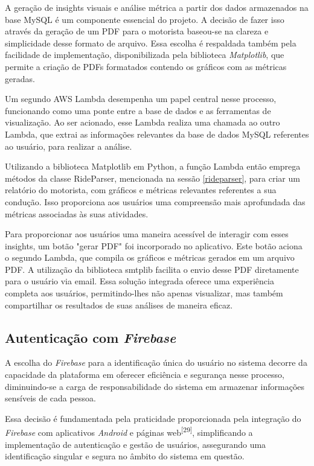     A geração de insights visuais e análise métrica a partir dos dados armazenados na base MySQL é um componente essencial do projeto. A decisão de fazer isso através da geração de um PDF para o motorista baseou-se na clareza e simplicidade desse formato de arquivo. Essa escolha é respaldada também pela facilidade de implementação, disponibilizada pela biblioteca \textit{Matplotlib}, que permite a criação de PDFs formatados contendo os gráficos com as métricas geradas.
    
    Um segundo AWS Lambda desempenha um papel central nesse processo, funcionando como uma ponte entre a base de dados e as ferramentas de visualização. Ao ser acionado, esse Lambda realiza uma chamada ao outro Lambda, que extrai as informações relevantes da base de dados MySQL referentes ao usuário, para realizar a análise.

    Utilizando a biblioteca Matplotlib em Python, a função Lambda então emprega métodos da classe RideParser, mencionada na sessão \ref{rideparser}, para criar um relatório do motorista, com gráficos e métricas relevantes referentes a sua condução. Isso proporciona aos usuários uma compreensão mais aprofundada das métricas associadas às suas atividades.
    
    Para proporcionar aos usuários uma maneira acessível de interagir com esses insights, um botão "gerar PDF" foi incorporado no aplicativo. Este botão aciona o segundo Lambda, que compila os gráficos e métricas gerados em um arquivo PDF. A utilização da biblioteca smtplib facilita o envio desse PDF diretamente para o usuário via email. Essa solução integrada oferece uma experiência completa aos usuários, permitindo-lhes não apenas visualizar, mas também compartilhar os resultados de suas análises de maneira eficaz.    

    \subsection{Autenticação com \textit{Firebase}}

    A  escolha do \textit{Firebase} para a identificação única do usuário no sistema decorre da capacidade da plataforma em oferecer eficiência e segurança nesse processo, diminuindo-se a carga de responsabilidade do sistema em armazenar informações sensíveis de cada pessoa. 
    
    Essa decisão é fundamentada pela praticidade proporcionada pela integração do \textit{Firebase} com aplicativos \textit{Android} e páginas web\textsuperscript{[29]}, simplificando a implementação de autenticação e gestão de usuários, assegurando uma identificação singular e segura no âmbito do sistema em questão.

